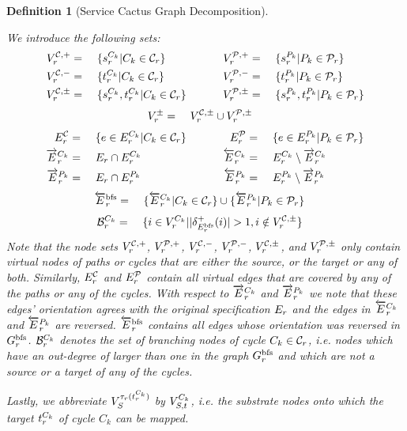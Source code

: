\documentclass[10pt, conference, letterpaper]{IEEEtran}
\newtheorem{definition}[theorem]{Definition}
\begin{document}
\begin{definition}[Service Cactus Graph Decomposition]
\begin{enumerate}
\end{enumerate}
We introduce the following sets:
{
\abovedisplayskip=0pt
\vskip0cm
\belowdisplayskip=8pt
\begin{alignat*}{6}
\VVcycleSources &=&&~ \{\VVcycleSource| C_k \in \Cycles\} &\quad&&~
\VVpathSources &=&&~ \{\VVpathSource | P_k \in \Paths\} \\
\VVcycleTargets &=&&~ \{\VVcycleTarget | C_k \in \Cycles\} 
&\quad&&~
\VVpathTargets &=&&~ \{\VVpathTarget | P_k \in \Paths\} \\
\VVcycleSourcesTargets &=&&~ \{\VVcycleSource, \VVcycleTarget | C_k \in \Cycles\} 
&\quad&&~
 \VVpathSourcesTargets &=&&~ \{\VVpathSource, \VVpathTarget | P_k \in \Paths\}
\end{alignat*}
\begin{alignat*}{3}
\VVSourcesTargets &= &&~ \VVcycleSourcesTargets \cup \VVpathSourcesTargets
\end{alignat*}
\begin{alignat*}{6}
\VEcycles &=&&~ \{ e \in \VEcycle | C_k \in \Cycles\} 
&\quad&&~
\VEpaths  &=&&~ \{e \in \VEpath | P_k \in \Paths\} \\
\VEcycleSame &=&&~ \VE \cap \VEcycle
&\quad&&~
\VEcycleDiff &=&&~ \VEcycle \setminus \VEcycleSame \\
\VEpathSame &=&&~ \VE \cap \VEpath
&\quad&&~
\VEpathDiff &=&&~ \VEpath \setminus \VEpathSame
\end{alignat*}\begin{alignat*}{3}
\VEDiff &=&&~ \{\VEcycleDiff | C_k \in \Cycles\} \cup \{\VEpathDiff | P_k \in \Paths\} 
\end{alignat*}
\begin{alignat*}{3}
\VVbranchingcycle &=&&~ \{i \in \VVcycle | |\delta_{\VEbfs}^+(i)| > 1, i \notin \VVcycleSourcesTargets \}
\end{alignat*}
}
Note that the node sets $\VVcycleSources$, $\VVpathSources$, $\VVcycleTargets$, $\VVpathTargets$, $\VVcycleSourcesTargets$, and $\VVpathSourcesTargets$ only contain virtual nodes of paths or cycles that are either the source, or the target or any of both.
Similarly, $\VEcycles$ and $\VEpaths$ contain all virtual edges that are covered by any of the paths or any of the cycles. With respect to $\VEcycleSame$ and $\VEpathSame$ we note that these edges' orientation agrees with the original specification $E_{r}$ and the edges in $\VEcycleDiff$ and $\VEpathDiff$ are reversed. $\VEDiff$ contains all edges whose orientation was reversed in $G^{\textnormal{bfs}}_{r}$. $\VVbranchingcycle$ denotes the set of \emph{branching nodes} of cycle $C_k \in \Cycles$, i.e. nodes which have an out-degree of larger than one in the graph $G^{\textnormal{bfs}}_{r}$ and which are not a source or a target of any of the cycles.

Lastly, we abbreviate $\SVTypes[\Vtype(\VVcycleTarget)]$ by $V^{C_k}_{S,t}$, i.e. the substrate nodes onto which the target $\VVcycleTarget$ of cycle $C_k$ can be mapped.
\end{definition}
\end{document}

